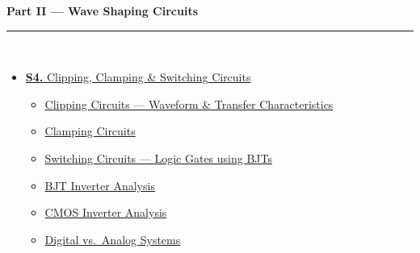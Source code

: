 \documentclass[12pt,a4paper]{article}
\begin{document}
\vspace{6pt}

\begin{tcolorbox}[breakable,colback=cB!5,colframe=cB,boxrule=1pt,arc=5pt,
  left=8pt,right=8pt,top=8pt,bottom=8pt,before skip=4pt]
  {\large\bfseries\textcolor{cB}{Part II --- Wave Shaping Circuits}}\\[5pt]
  \textcolor{cB!40}{\rule{\textwidth}{0.4pt}}\\[3pt]
  \small\begin{itemize}[leftmargin=1.2em,itemsep=1pt,label={\textcolor{cB}{$\triangleright$}}]
    \item \hyperref[sec:S4]{\textbf{S4.} Clipping, Clamping \& Switching Circuits}
      \begin{itemize}[leftmargin=1.5em,itemsep=0pt,label={\textcolor{cB}{$\cdot$}}]
        \item \hyperref[sub:s4-clipping]{Clipping Circuits --- Waveform \& Transfer Characteristics}
        \item \hyperref[sub:s4-clamping]{Clamping Circuits}
        \item \hyperref[sub:s4-switching]{Switching Circuits --- Logic Gates using BJTs}
        \item \hyperref[sub:s4-inverter]{BJT Inverter Analysis}
        \item \hyperref[sub:s4-cmos]{CMOS Inverter Analysis}
        \item \hyperref[sub:s4-digital]{Digital vs.\ Analog Systems}
      \end{itemize}
  \end{itemize}
\end{tcolorbox}

\vspace{6pt}
\end{document}
